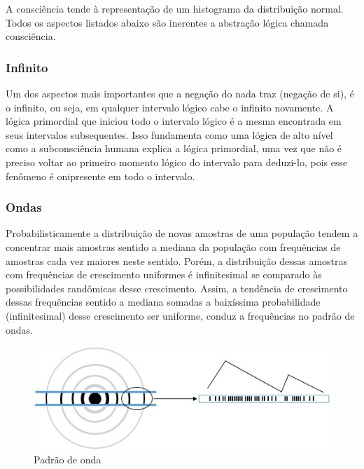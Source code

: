 A consciência tende à representação de um histograma da distribuição normal. Todos os aspectos listados abaixo são inerentes a abstração lógica chamada consciência.

\subsubsection{Infinito}
Um dos aspectos mais importantes que a negação do nada traz (negação de si), é o infinito, ou seja, em qualquer intervalo lógico cabe o infinito novamente. A lógica primordial que iniciou todo o intervalo lógico é a mesma encontrada em seus intervalos subsequentes. Isso fundamenta como uma lógica de alto nível como a subconsciência humana explica a lógica primordial, uma vez que não é preciso voltar ao primeiro momento lógico do intervalo para deduzi-lo, pois esse fenômeno é onipresente em todo o intervalo.

\subsubsection{Ondas}
Probabilisticamente a distribuição de novas amostras de uma população tendem a concentrar mais amostras sentido a mediana da população com frequências de amostras cada vez maiores neste sentido. Porém, a distribuição dessas amostras com frequências de crescimento uniformes é infinitesimal se comparado às possibilidades randômicas desse crescimento. Assim, a tendência de crescimento dessas frequências sentido a mediana somadas a baixíssima probabilidade (infinitesimal) desse crescimento ser uniforme, conduz a frequências no padrão de ondas.
	\begin{figure}[H]
	\caption{Padrão de onda}
	\label{fig:consciousness_waves}
	\centering
	\includegraphics[scale=1]{sections/images/consciousness_waves.jpg}
	\end{figure}

